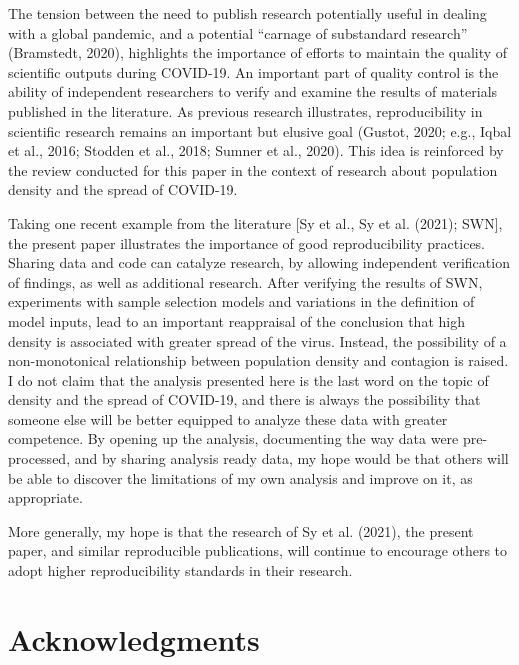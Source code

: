 \documentclass[]{elsarticle} %
\begin{document}
The tension between the need to publish research potentially useful in
dealing with a global pandemic, and a potential ``carnage of substandard
research'' (Bramstedt, 2020), highlights the importance of efforts to
maintain the quality of scientific outputs during COVID-19. An important
part of quality control is the ability of independent researchers to
verify and examine the results of materials published in the literature.
As previous research illustrates, reproducibility in scientific research
remains an important but elusive goal (Gustot, 2020; e.g., Iqbal et al.,
2016; Stodden et al., 2018; Sumner et al., 2020). This idea is
reinforced by the review conducted for this paper in the context of
research about population density and the spread of COVID-19.

Taking one recent example from the literature {[}Sy et al., Sy et al.
(2021); SWN{]}, the present paper illustrates the importance of good
reproducibility practices. Sharing data and code can catalyze research,
by allowing independent verification of findings, as well as additional
research. After verifying the results of SWN, experiments with sample
selection models and variations in the definition of model inputs, lead
to an important reappraisal of the conclusion that high density is
associated with greater spread of the virus. Instead, the possibility of
a non-monotonical relationship between population density and contagion
is raised. I do not claim that the analysis presented here is the last
word on the topic of density and the spread of COVID-19, and there is
always the possibility that someone else will be better equipped to
analyze these data with greater competence. By opening up the analysis,
documenting the way data were pre-processed, and by sharing analysis
ready data, my hope would be that others will be able to discover the
limitations of my own analysis and improve on it, as appropriate.

More generally, my hope is that the research of Sy et al. (2021), the
present paper, and similar reproducible publications, will continue to
encourage others to adopt higher reproducibility standards in their
research.

\hypertarget{acknwledgments}{%
\section*{Acknowledgments}\label{acknwledgments}}
\end{document}
